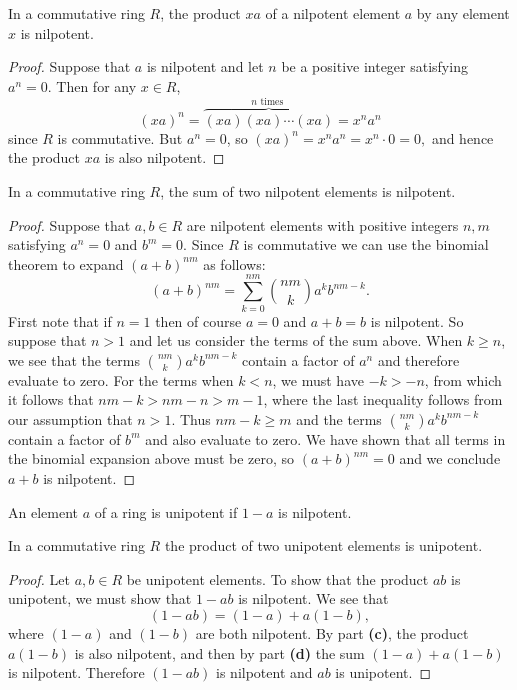 \documentclass{article}
\newenvironment{problem2}[1]{\noindent {\bf (#1}}
{\medskip}
\newenvironment{definition}[1][Definition]{\begin{trivlist}
\item[\hskip \labelsep {\bfseries #1}]}{\end{trivlist}}
\begin{document}
\begin{problem2}{c)} In a commutative ring $R$, the product $xa$ of a nilpotent element $a$ by any element $x$ is nilpotent.
\begin{proof} Suppose that $a$ is nilpotent and let $n$ be a positive integer satisfying $a^n=0$. Then for any $x\in R$, $$(xa)^n=\overbrace{(xa)(xa)\cdots(xa)}^{n \text{ times }}=x^na^n$$ since $R$ is commutative. But $a^n=0$, so $(xa)^n=x^na^n=x^n\cdot0=0,$ and hence the product $xa$ is also nilpotent.
\end{proof}
\end{problem2}


\begin{problem2}{d)} In a commutative ring $R$, the sum of two nilpotent elements is nilpotent.
\begin{proof} Suppose that $a,b\in R$ are nilpotent elements with positive integers $n,m$ satisfying $a^n=0$ and $b^m=0$. Since $R$ is commutative we can use the binomial theorem to expand $(a+b)^{nm}$ as follows: $$(a+b)^{nm}=\sum_{k=0}^{nm}{nm \choose k} a^{k} b^{nm-k}.$$ First note that if $n=1$ then of course $a=0$ and $a+b=b$ is nilpotent. So suppose that $n>1$ and let us consider the terms of the sum above. When $k\ge n$, we see that the terms ${nm\choose k}a^kb^{nm-k}$ contain a factor of $a^n$ and therefore evaluate to zero. For the terms when $k<n$, we must have $-k>-n$, from which it follows that $nm-k>nm-n>m-1$, where the last inequality follows from our assumption that $n>1$. Thus $nm-k\ge m$ and the terms ${nm\choose k}a^kb^{nm-k}$ contain a factor of $b^m$ and also evaluate to zero. We have shown that all terms in the binomial expansion above must be zero, so $(a+b)^{nm}=0$ and we conclude $a+b$ is nilpotent.
\end{proof}
\end{problem2}

\begin{definition}An element $a$ of a ring is unipotent if $1-a$ is nilpotent.\end{definition}

\begin{problem2}{e)} In a commutative ring $R$ the product of two unipotent elements is unipotent.
\begin{proof} Let $a,b\in R$ be unipotent elements. To show that the product $ab$ is unipotent, we must show that $1-ab$ is nilpotent. We see that $$(1-ab)=(1-a)+a(1-b),$$ where $(1-a)$ and $(1-b)$ are both nilpotent. By part \textbf{(c)}, the product $a(1-b)$ is also nilpotent, and then by part \textbf{(d)} the sum $(1-a)+a(1-b)$ is nilpotent. Therefore $(1-ab)$ is nilpotent and $ab$ is unipotent.
\end{proof}
\end{problem2}
\end{document}
